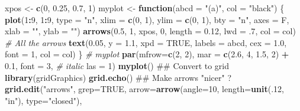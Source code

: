 \documentclass[]{article}
\newenvironment{Shaded}{\begin{snugshade}}{\end{snugshade}}
\newcommand{\KeywordTok}[1]{\textcolor[rgb]{0.13,0.29,0.53}{\textbf{#1}}}
\newcommand{\DataTypeTok}[1]{\textcolor[rgb]{0.13,0.29,0.53}{#1}}
\newcommand{\DecValTok}[1]{\textcolor[rgb]{0.00,0.00,0.81}{#1}}
\newcommand{\FloatTok}[1]{\textcolor[rgb]{0.00,0.00,0.81}{#1}}
\newcommand{\StringTok}[1]{\textcolor[rgb]{0.31,0.60,0.02}{#1}}
\newcommand{\CommentTok}[1]{\textcolor[rgb]{0.56,0.35,0.01}{\textit{#1}}}
\newcommand{\OtherTok}[1]{\textcolor[rgb]{0.56,0.35,0.01}{#1}}
\newcommand{\ControlFlowTok}[1]{\textcolor[rgb]{0.13,0.29,0.53}{\textbf{#1}}}
\newcommand{\OperatorTok}[1]{\textcolor[rgb]{0.81,0.36,0.00}{\textbf{#1}}}
\newcommand{\NormalTok}[1]{#1}
\begin{document}
\begin{Shaded}
\begin{Highlighting}[]
\NormalTok{xpos <-}\StringTok{ }\KeywordTok{c}\NormalTok{(}\DecValTok{0}\NormalTok{, }\FloatTok{0.25}\NormalTok{,  }\FloatTok{0.7}\NormalTok{, }\DecValTok{1}\NormalTok{)}
\NormalTok{myplot <-}\StringTok{ }\ControlFlowTok{function}\NormalTok{(}\DataTypeTok{abcd =} \StringTok{"(a)"}\NormalTok{, }\DataTypeTok{col =} \StringTok{"black"}\NormalTok{) \{}
  \KeywordTok{plot}\NormalTok{(}\DecValTok{1}\OperatorTok{:}\DecValTok{9}\NormalTok{, }\DecValTok{1}\OperatorTok{:}\DecValTok{9}\NormalTok{, }\DataTypeTok{type =} \StringTok{"n"}\NormalTok{, }\DataTypeTok{xlim =} \KeywordTok{c}\NormalTok{(}\DecValTok{0}\NormalTok{, }\DecValTok{1}\NormalTok{), }\DataTypeTok{ylim =} \KeywordTok{c}\NormalTok{(}\DecValTok{0}\NormalTok{, }\DecValTok{1}\NormalTok{), }
       \DataTypeTok{bty =} \StringTok{"n"}\NormalTok{, }\DataTypeTok{axes =}\NormalTok{ F, }\DataTypeTok{xlab =} \StringTok{""}\NormalTok{, }\DataTypeTok{ylab =} \StringTok{""}\NormalTok{)}
  \KeywordTok{arrows}\NormalTok{(}\FloatTok{0.5}\NormalTok{, }\DecValTok{1}\NormalTok{, xpos, }\DecValTok{0}\NormalTok{, }\DataTypeTok{length =} \FloatTok{0.12}\NormalTok{, }\DataTypeTok{lwd =} \FloatTok{.7}\NormalTok{,}
         \DataTypeTok{col =}\NormalTok{ col)  }\CommentTok{# All the arrows}
  \KeywordTok{text}\NormalTok{(}\FloatTok{0.05}\NormalTok{, }\DataTypeTok{y =} \FloatTok{1.1}\NormalTok{, }\DataTypeTok{xpd =} \OtherTok{TRUE}\NormalTok{, }\DataTypeTok{labels =}\NormalTok{ abcd, }\DataTypeTok{cex =} \FloatTok{1.0}\NormalTok{,}
       \DataTypeTok{font =} \DecValTok{1}\NormalTok{, }\DataTypeTok{col =}\NormalTok{ col)}
\NormalTok{\}  }\CommentTok{# myplot}
\KeywordTok{par}\NormalTok{(}\DataTypeTok{mfrow=}\KeywordTok{c}\NormalTok{(}\DecValTok{2}\NormalTok{, }\DecValTok{2}\NormalTok{),}
    \DataTypeTok{mar =} \KeywordTok{c}\NormalTok{(}\FloatTok{2.6}\NormalTok{, }\DecValTok{4}\NormalTok{, }\FloatTok{1.5}\NormalTok{, }\DecValTok{2}\NormalTok{) }\OperatorTok{+}\StringTok{ }\FloatTok{0.1}\NormalTok{,}
    \DataTypeTok{font =} \DecValTok{3}\NormalTok{,  }\CommentTok{# italic}
    \DataTypeTok{las =} \DecValTok{1}\NormalTok{)}
\KeywordTok{myplot}\NormalTok{()}
\NormalTok{## Convert to grid}
\KeywordTok{library}\NormalTok{(gridGraphics)}
\KeywordTok{grid.echo}\NormalTok{()}
\NormalTok{## Make arrows "nicer" ? }
\KeywordTok{grid.edit}\NormalTok{(}\StringTok{"arrows"}\NormalTok{, }\DataTypeTok{grep=}\OtherTok{TRUE}\NormalTok{,}
          \DataTypeTok{arrow=}\KeywordTok{arrow}\NormalTok{(}\DataTypeTok{angle=}\DecValTok{10}\NormalTok{, }\DataTypeTok{length=}\KeywordTok{unit}\NormalTok{(.}\DecValTok{12}\NormalTok{, }\StringTok{"in"}\NormalTok{), }\DataTypeTok{type=}\StringTok{"closed"}\NormalTok{),}

\end{Highlighting}
\end{Shaded}
\end{document}
